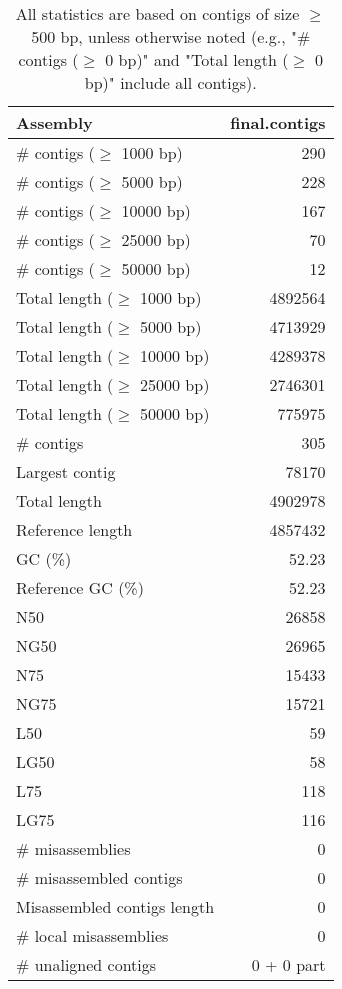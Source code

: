\documentclass[12pt,a4paper]{article}
\begin{document}
\begin{table}[ht]
\begin{center}
\caption{All statistics are based on contigs of size $\geq$ 500 bp, unless otherwise noted (e.g., "\# contigs ($\geq$ 0 bp)" and "Total length ($\geq$ 0 bp)" include all contigs).}
\begin{tabular}{|l*{1}{|r}|}
\hline
Assembly & final.contigs \\ \hline
\# contigs ($\geq$ 1000 bp) & 290 \\ \hline
\# contigs ($\geq$ 5000 bp) & 228 \\ \hline
\# contigs ($\geq$ 10000 bp) & 167 \\ \hline
\# contigs ($\geq$ 25000 bp) & 70 \\ \hline
\# contigs ($\geq$ 50000 bp) & 12 \\ \hline
Total length ($\geq$ 1000 bp) & 4892564 \\ \hline
Total length ($\geq$ 5000 bp) & 4713929 \\ \hline
Total length ($\geq$ 10000 bp) & 4289378 \\ \hline
Total length ($\geq$ 25000 bp) & 2746301 \\ \hline
Total length ($\geq$ 50000 bp) & 775975 \\ \hline
\# contigs & 305 \\ \hline
Largest contig & 78170 \\ \hline
Total length & 4902978 \\ \hline
Reference length & 4857432 \\ \hline
GC (\%) & 52.23 \\ \hline
Reference GC (\%) & 52.23 \\ \hline
N50 & 26858 \\ \hline
NG50 & 26965 \\ \hline
N75 & 15433 \\ \hline
NG75 & 15721 \\ \hline
L50 & 59 \\ \hline
LG50 & 58 \\ \hline
L75 & 118 \\ \hline
LG75 & 116 \\ \hline
\# misassemblies & 0 \\ \hline
\# misassembled contigs & 0 \\ \hline
Misassembled contigs length & 0 \\ \hline
\# local misassemblies & 0 \\ \hline
\# unaligned contigs & 0 + 0 part \\ \hline

\end{tabular}
\end{center}
\end{table}
\end{document}
